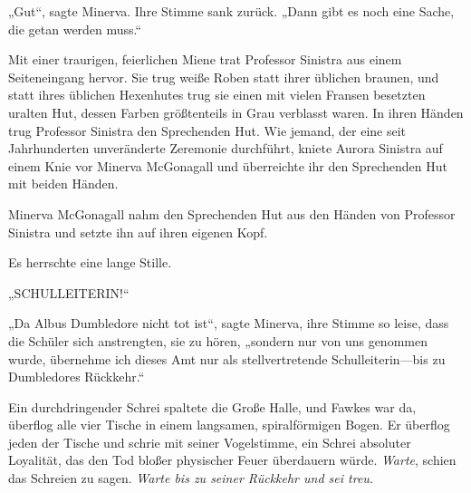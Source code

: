 „Gut“, sagte Minerva. Ihre Stimme sank zurück. „Dann gibt es noch eine Sache, die getan werden muss.“

Mit einer traurigen, feierlichen Miene trat Professor Sinistra aus einem Seiteneingang hervor. Sie trug weiße Roben statt ihrer üblichen braunen, und statt ihres üblichen Hexenhutes trug sie einen mit vielen Fransen besetzten uralten Hut, dessen Farben größtenteils in Grau verblasst waren.
In ihren Händen trug Professor Sinistra den Sprechenden Hut.
Wie jemand, der eine seit Jahrhunderten unveränderte Zeremonie durchführt, kniete Aurora Sinistra auf einem Knie vor Minerva McGonagall und überreichte ihr den Sprechenden Hut mit beiden Händen.

Minerva McGonagall nahm den Sprechenden Hut aus den Händen von Professor Sinistra und setzte ihn auf ihren eigenen Kopf.

Es herrschte eine lange Stille.

„SCHULLEITERIN!“

„Da Albus Dumbledore nicht tot ist“, sagte Minerva, ihre Stimme so leise, dass die Schüler sich anstrengten, sie zu hören, „sondern nur von uns genommen wurde, übernehme ich dieses Amt nur als stellvertretende Schulleiterin—bis zu Dumbledores Rückkehr.“

Ein durchdringender Schrei spaltete die Große Halle, und Fawkes war da, überflog alle vier Tische in einem langsamen, spiralförmigen Bogen. Er überflog jeden der Tische und schrie mit seiner Vogelstimme, ein Schrei absoluter Loyalität, das den Tod bloßer physischer Feuer überdauern würde.
\emph{Warte}, schien das Schreien zu sagen. \emph{Warte bis zu seiner Rückkehr und sei treu.}


